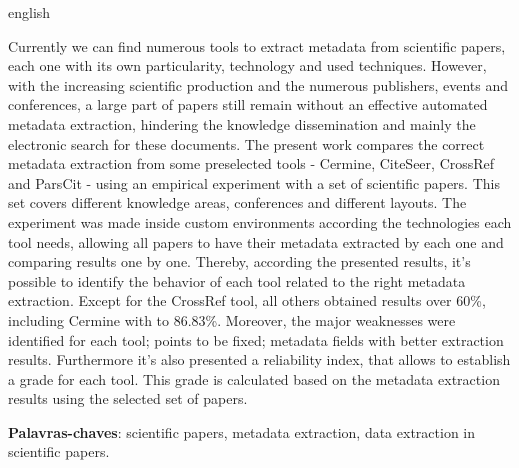 \begin{resumo}[Abstract]
\begin{otherlanguage*}{english}

Currently we can find numerous tools to extract metadata from scientific papers, each one with its own particularity, technology and used techniques. However, with the increasing scientific production and the numerous publishers, events and conferences, a large part of papers still remain without an effective automated metadata extraction, hindering the knowledge dissemination and mainly the electronic search for these documents. The present work compares the correct metadata extraction from some preselected tools - Cermine, CiteSeer, CrossRef and ParsCit - using an empirical experiment with a set of scientific papers. This set covers different knowledge areas, conferences and different layouts. The experiment was made inside custom environments according the technologies each tool needs, allowing all papers to have their metadata extracted by each one and comparing results one by one. Thereby, according the presented results, it's possible to identify the behavior of each tool related to the right metadata extraction. Except for the CrossRef tool, all others obtained results over 60\%, including Cermine with to 86.83\%. Moreover, the major weaknesses were identified for each tool; points to be fixed; metadata fields with better extraction results. Furthermore it's also presented a reliability index, that allows to establish a grade for each tool. This grade is calculated based on the metadata extraction results using the selected set of papers.

\textbf{Palavras-chaves}: scientific papers, metadata extraction, data extraction in scientific papers.


\end{otherlanguage*}
\end{resumo}

 

  
